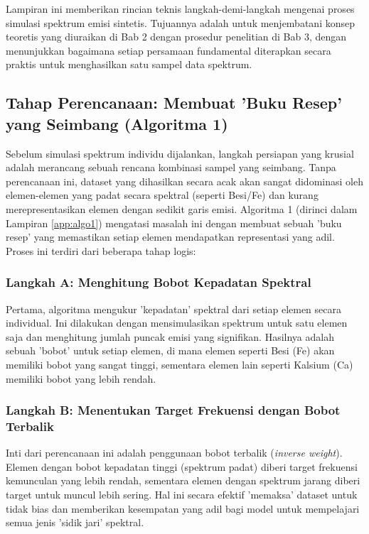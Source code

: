 
\label{app:simulasi}

Lampiran ini memberikan rincian teknis langkah-demi-langkah mengenai proses simulasi spektrum emisi sintetis. Tujuannya adalah untuk menjembatani konsep teoretis yang diuraikan di Bab 2 dengan prosedur penelitian di Bab 3, dengan menunjukkan bagaimana setiap persamaan fundamental diterapkan secara praktis untuk menghasilkan satu sampel data spektrum.

\subsection{Tahap Perencanaan: Membuat 'Buku Resep' yang Seimbang (Algoritma 1)}

Sebelum simulasi spektrum individu dijalankan, langkah persiapan yang krusial adalah merancang sebuah rencana kombinasi sampel yang seimbang. Tanpa perencanaan ini, dataset yang dihasilkan secara acak akan sangat didominasi oleh elemen-elemen yang padat secara spektral (seperti Besi/Fe) dan kurang merepresentasikan elemen dengan sedikit garis emisi. Algoritma 1 (dirinci dalam Lampiran \ref{app:algo1}) mengatasi masalah ini dengan membuat sebuah 'buku resep' yang memastikan setiap elemen mendapatkan representasi yang adil. Proses ini terdiri dari beberapa tahap logis:

\subsubsection*{Langkah A: Menghitung Bobot Kepadatan Spektral}
Pertama, algoritma mengukur 'kepadatan' spektral dari setiap elemen secara individual. Ini dilakukan dengan mensimulasikan spektrum untuk satu elemen saja dan menghitung jumlah puncak emisi yang signifikan. Hasilnya adalah sebuah 'bobot' untuk setiap elemen, di mana elemen seperti Besi (Fe) akan memiliki bobot yang sangat tinggi, sementara elemen lain seperti Kalsium (Ca) memiliki bobot yang lebih rendah.

\subsubsection*{Langkah B: Menentukan Target Frekuensi dengan Bobot Terbalik}
Inti dari perencanaan ini adalah penggunaan bobot terbalik (\textit{inverse weight}). Elemen dengan bobot kepadatan tinggi (spektrum padat) diberi target frekuensi kemunculan yang lebih rendah, sementara elemen dengan spektrum jarang diberi target untuk muncul lebih sering. Hal ini secara efektif 'memaksa' dataset untuk tidak bias dan memberikan kesempatan yang adil bagi model untuk mempelajari semua jenis 'sidik jari' spektral.

